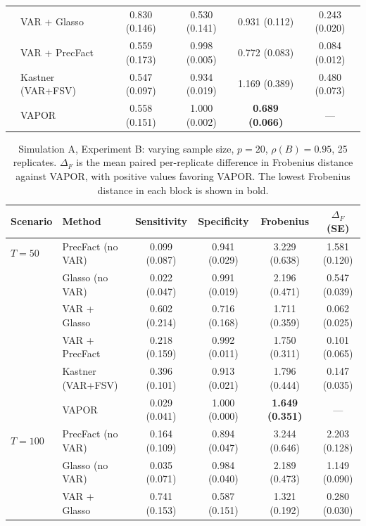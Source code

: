 \begin{table}[h!]
\begin{tabular}{llcccc}
              & VAR + Glasso       & 0.830 (0.146) & 0.530 (0.141) & 0.931 (0.112) & 0.243 (0.020) \\
              & VAR + PrecFact     & 0.559 (0.173) & 0.998 (0.005) & 0.772 (0.083) & 0.084 (0.012) \\
              & Kastner (VAR+FSV)  & 0.547 (0.097) & 0.934 (0.019) & 1.169 (0.389) & 0.480 (0.073) \\
              & VAPOR              & 0.558 (0.151) & 1.000 (0.002) & \textbf{0.689 (0.066)} & --- \\
\bottomrule
\end{tabular}
\end{table}

\begin{table}[h!]
\centering
\small
\setlength{\tabcolsep}{4pt}
\caption{Simulation A, Experiment B: varying sample size, $p=20$, $\rho(B)=0.95$, 25 replicates. $\Delta_F$ is the mean paired per-replicate difference in Frobenius distance against VAPOR, with positive values favoring VAPOR. The lowest Frobenius distance in each block is shown in bold.}
\label{tab:sim-a-samplesize}
\begin{tabular}{llcccc}
\toprule
Scenario & Method & Sensitivity & Specificity & Frobenius & $\Delta_F$ (SE) \\
\midrule
$T = 50$   & PrecFact (no VAR)  & 0.099 (0.087) & 0.941 (0.029) & 3.229 (0.638) & 1.581 (0.120) \\
           & Glasso (no VAR)    & 0.022 (0.047) & 0.991 (0.019) & 2.196 (0.471) & 0.547 (0.039) \\
           & VAR + Glasso       & 0.602 (0.214) & 0.716 (0.168) & 1.711 (0.359) & 0.062 (0.025) \\
           & VAR + PrecFact     & 0.218 (0.159) & 0.992 (0.011) & 1.750 (0.311) & 0.101 (0.065) \\
           & Kastner (VAR+FSV)  & 0.396 (0.101) & 0.913 (0.021) & 1.796 (0.444) & 0.147 (0.035) \\
           & VAPOR              & 0.029 (0.041) & 1.000 (0.000) & \textbf{1.649 (0.351)} & --- \\
\midrule
$T = 100$  & PrecFact (no VAR)  & 0.164 (0.109) & 0.894 (0.047) & 3.244 (0.646) & 2.203 (0.128) \\
           & Glasso (no VAR)    & 0.035 (0.071) & 0.984 (0.040) & 2.189 (0.473) & 1.149 (0.090) \\
           & VAR + Glasso       & 0.741 (0.153) & 0.587 (0.151) & 1.321 (0.192) & 0.280 (0.030) \\

\end{tabular}
\end{table}
